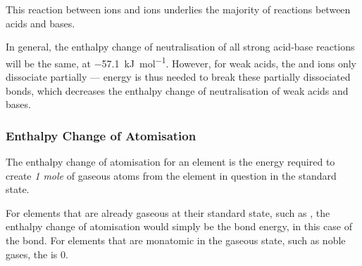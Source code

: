 			\pagebreak
			This reaction between  ions and  ions underlies the majority of reactions between acids and bases.



			In general, the enthalpy change of neutralisation of all strong acid-base reactions will be the same,
			at \SI{-57.1}{\kilo\joule\per\mole}. However, for weak acids, the  and  ions only dissociate
			partially –– energy is thus needed to break these partially dissociated bonds, which decreases the enthalpy change
			of neutralisation of weak acids and bases.





		\subsubsection{Enthalpy Change of Atomisation}

			The enthalpy change of atomisation for an element is the energy required to create \emph{1 mole} of gaseous atoms from the
			element in question in the standard state.


			For elements that are already gaseous at their standard state, such as , the enthalpy change of atomisation would
			simply be the bond energy, in this case of the  bond. For elements that are monatomic in the gaseous state,
			such as noble gases, the  is 0.



